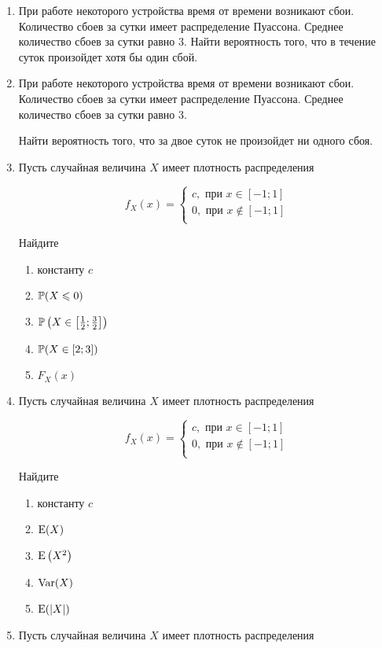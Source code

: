 \begin{enumerate}
\item При работе некоторого устройства время от времени возникают сбои.
Количество сбоев за сутки имеет распределение Пуассона. Среднее количество сбоев за сутки равно 3. Найти вероятность того, что в течение суток произойдет хотя бы один сбой.

\item При работе некоторого устройства время от времени возникают сбои.
Количество сбоев за сутки имеет распределение Пуассона.
Среднее количество сбоев за сутки равно 3.

Найти вероятность того, что за двое суток не произойдет ни одного сбоя.

\item Пусть случайная величина $X$ имеет плотность распределения

\[
f_X(x) =
	\begin{cases}
	c,\text{ при }  x \in [-1; 1] \\
	0,\text{ при } x \notin  [-1; 1] \\
	\end{cases}
\]

Найдите
\begin{enumerate}
	\item константу $c$
	\item $\P(X \leq 0)$
	\item $\P\left(X \in \left[\frac{1}{2}; \frac{3}{2}\right]\right)$
	\item $\P(X \in [2;3])$
	\item $F_X(x)$
\end{enumerate}

\item Пусть случайная величина $X$ имеет плотность распределения

\[
f_X(x) =
	\begin{cases}
	c,\text{ при }  x \in [-1; 1] \\
	0,\text{ при } x \notin  [-1; 1] \\
	\end{cases}
\]

Найдите
\begin{enumerate}
	\item константу $c$
	\item $\E(X)$
	\item $\E\left(X^2\right)$
	\item $\Var(X)$
	\item $\E(|X|)$
\end{enumerate}

\item Пусть случайная величина $X$ имеет плотность распределения


\end{enumerate}
